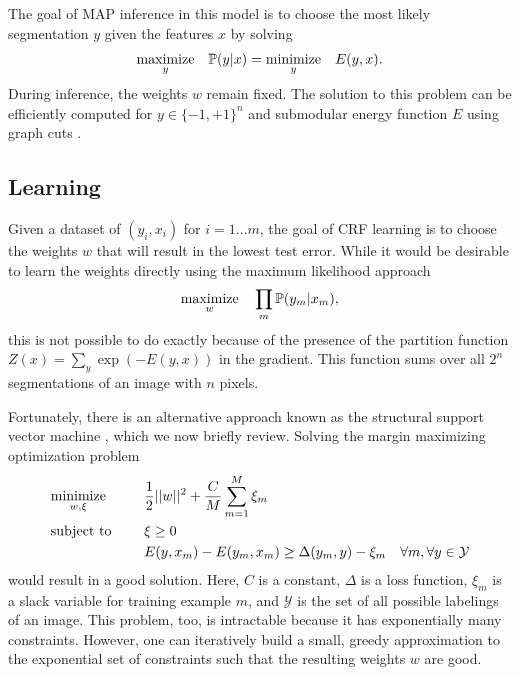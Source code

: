 \documentclass[graybox]{svmult}
\begin{document}
The goal of MAP inference in this model is to choose the most likely segmentation $y$ given the features $x$ by solving
\begin{align}
  \underset{y}{\mbox{maximize}}\quad \mathbb{P}(y | x) = \underset{y}{\mbox{minimize}}\quad E(y, x).
\end{align}
During inference, the weights $w$ remain fixed.  The solution to this problem can be efficiently computed for $y \in \{-1, +1\}^n$ and submodular energy function $E$ using graph cuts \cite{boykov2001a}.

\subsection{Learning}
\label{sec:learning}

Given a dataset of $(y_i, x_i)$ for $i=1 \dots m$, the goal of CRF learning is to choose the weights $w$ that will result in the lowest test error. While it would be desirable to learn the weights directly using the maximum likelihood approach
\begin{align}
  \underset{w}{\mbox{maximize}}\quad \prod_m \mathbb{P}(y_m | x_m),
\end{align}
this is not possible to do exactly because of the presence of the partition function $Z(x) = \sum_{y} \exp(-E(y, x))$ in the gradient.  This function sums over all $2^n$ segmentations of an image with $n$ pixels.
  
Fortunately, there is an alternative approach known as the structural support vector machine \cite{taskar2005a, tsochantaridis2005a, szummer2008a}, which we now briefly review.  Solving the margin maximizing optimization problem
\begin{equation}
  \begin{aligned}
    & \minimize{w, \xi} & & \frac{1}{2} ||w||^2 + \frac{C}{M} \sum_{m=1}^M \xi_m \label{eqn:nslack} \\
    & \st & & \xi \geq 0 \\
& & & E ( y, x_m ) - E ( y_m, x_m ) \geq \Delta (y_m, y) - \xi_m \quad \forall m, \forall y \in \mathcal{Y}
  \end{aligned}
\end{equation}
would result in a good solution. Here, $C$ is a constant, $\Delta$ is a loss function, $\xi_m$ is a slack variable for training example $m$, and $\mathcal{Y}$ is the set of all possible labelings of an image. This problem, too, is intractable because it has exponentially many constraints.  However, one can iteratively build a small, greedy approximation to the exponential set of constraints such that the resulting weights $w$ are good.
\end{document}
